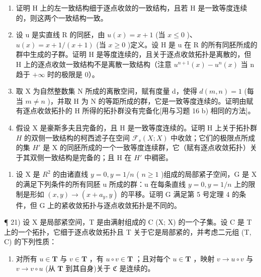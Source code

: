 \begin{enumerate}
\def\labelenumi{\alph{enumi})}
\item
  证明 H 上的左一致结构细于逐点收敛的一致结构，且若 H 是一致等度连续的，则这两个一致结构一致。
\item
  设 u 是实直线 R 的同胚，由 \(u(x) = x + 1\) (当 \(x \leqslant 0\) )、\(u(x) = x + 1/(x + 1)\) (当 \(x \geqslant 0\) )定义。设 H 是 u 在 R 的所有同胚所成的群中生成的子群。证明 H 是等度连续的，且关于逐点收敛拓扑是离散的，但 H 上的逐点收敛一致结构不是离散一致结构（注意 \(u^{n+1}(x) - u^n(x)\) 当 n 趋于 \(+\infty\) 时的极限是 0）。
\item
  取 X 为自然整数集 N 所成的离散空间，赋有度量 d，使得 \(d(m, n) = 1\) (每当 \(m \neq n\) )，并取 H 为 N 的等距所成的群，它是一致等度连续的。证明由赋有逐点收敛拓扑的 H 所得的拓扑群没有完备化{[}用与习题 16 b) 相同的方法{]}。
\item
  假设 X 是豪斯多夫且完备的，且 H 是一致等度连续的。证明 H 上关于拓扑群 \(H\) 的双侧一致结构的柯西滤子在空间 \(\mathcal{F}_s(X;X)\) 中收敛；它们的极限点所成的集 \(H'\) 是 X 的同胚所成的一个一致等度连续群，它（赋有逐点收敛拓扑）关于其双侧一致结构是完备的；且 H 在 \(H'\) 中稠密。
\end{enumerate}

\begin{enumerate}
\def\labelenumi{\arabic{enumi})}
\setcounter{enumi}{19}
\tightlist
\item
  设 X 是 \(R^{2}\) 的由诸直线 \(y = 0, y = 1/n\) ( \(n \geqslant 1\) )组成的局部紧子空间，G 是 X 的满足下列条件的所有同胚 u 所成的群：u 在每条直线 \(y = 0, y = 1/n\) 上的限制是形如 \((x, y) \to (x + a_{y}, y)\) 的平移。证明 G 满足第 5 号定理 4 的条件，但 G 上的紧收敛拓扑与逐点收敛拓扑是不同的。
\end{enumerate}

¶ 21) 设 X 是局部紧空间，T 是由满射组成的 C (X; X) 的一个子集。设 C 是 T 上的一个拓扑，它细于逐点收敛拓扑且 T 关于它是局部紧的，并考虑二元组 (T, C) 的下列性质：

\begin{enumerate}
\def\labelenumi{(\Alph{enumi})}
\tightlist
\item
  对所有 \(u \in \mathbf{T}\) 与 \(v \in \mathbf{T}\) ，有 \(u \circ v \in \mathbf{T}\) ；且对每个 \(u \in \mathbf{T}\) ，映射 \(v \to u \circ v\) 与 \(v \to v \circ u\) (从 \(\mathbf{T}\) 到其自身)关于 \(\mathfrak{C}\) 是连续的。
\end{enumerate}

